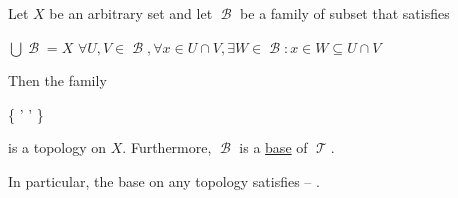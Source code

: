\begin{proposition}\label{thm:topological_base_axioms}
  Let \( X \) be an arbitrary set and let \( \mscrB \) be a family of subset that satisfies
  \begin{PropEnum}
     \( \bigcup \mscrB = X \)
     \( \forall U, V \in \mscrB, \forall x \in U \cap V, \exists W \in \mscrB: x \in W \subseteq U \cap V \)
  \end{PropEnum}

  Then the family
  \begin{BreakableAlign}\label{thm:topological_base_axioms/topology}
    \mscrT \coloneqq \left\{ \bigcup \mscrB' \colon \mscrB' \subseteq \mscrB \right\}
  \end{BreakableAlign}
  is a topology on \( X \). Furthermore, \( \mscrB \) is a \hyperref[def:topological_base]{base} of \( \mscrT \).

  In particular, the base on any topology satisfies  -- .
\end{proposition}
